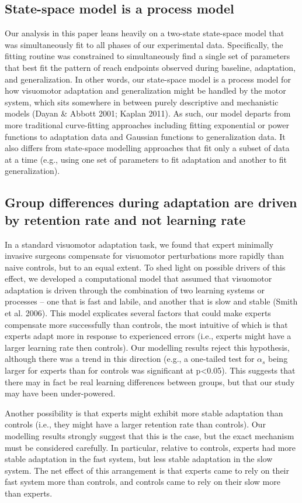 \documentclass[jou, apacite, 11pt, longtable, floatsintext, notab]{apa6}
\begin{document}
\subsection{State-space model is a process model}
Our analysis in this paper leans heavily on a two-state
state-space model that was  simultaneously fit to all phases
of our experimental data. Specifically, the fitting routine
was constrained to simultaneously find a single set of
parameters that best fit the pattern of reach endpoints
observed during baseline, adaptation, and generalization. In
other words, our state-space model is a process model for
how visuomotor adaptation and generalization might be
handled by the motor system, which sits somewhere in between
purely descriptive and mechanistic models (Dayan & Abbott
2001; Kaplan 2011). As such, our model departs from more
traditional curve-fitting approaches including fitting
exponential or power functions to adaptation data and
Gaussian functions to generalization data. It also differs
from state-space modelling approaches that fit only a subset
of data at a time (e.g., using one set of parameters to fit
adaptation and another to fit generalization).

\subsection{Group differences during adaptation are driven
  by retention rate and not learning rate}
In a standard visuomotor adaptation task, we found that
expert minimally invasive surgeons compensate for visuomotor
perturbations more rapidly than naive controls, but to an
equal extent. To shed light on possible drivers of this
effect, we developed a computational model that assumed that
visuomotor adaptation is driven through the combination of
two learning systems or processes -- one that is fast and
labile, and another that is slow and stable (Smith et al.
2006). This model explicates several factors that could make
experts compensate more successfully than controls, the most
intuitive of which is that experts adapt more in response to
experienced errors (i.e., experts might have a larger
learning rate then controls). Our modelling results reject
this hypothesis, although there was a trend in this
direction (e.g., a one-tailed test for $\alpha_s$ being
larger for experts than for controls was significant at
p<0.05). This suggests that there may in fact be real
learning differences between groups, but that our study may
have been under-powered.

Another possibility is that experts might exhibit more stable
adaptation than controls (i.e., they might have a larger
retention rate than controls). Our modelling results
strongly suggest that this is the case, but the exact
mechanism must be considered carefully. In particular,
relative to controls, experts had more stable adaptation in
the fast system, but less stable adaptation in the slow
system. The net effect of this arrangement is that experts
came to rely on their fast system more than controls, and
controls came to rely on their slow more than experts.
\end{document}
